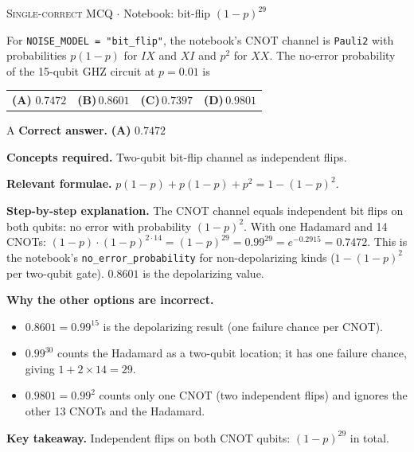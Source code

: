 \documentclass[11pt,a4paper]{article}
\newcommand{\optlabel}[1]{\textbf{(#1)}}
\newcommand{\correctlabel}[1]{\textcolor{okgreen}{\textbf{(#1)}\,\ding{51}}}
\newenvironment{qitem}[1]{\begin{list}{}{\setlength{\leftmargin}{3.3em}\setlength{\labelwidth}{3.1em}%
  \setlength{\labelsep}{0.2em}\setlength{\topsep}{3pt}\setlength{\parsep}{3pt}}\item[\textbf{Q.#1}\hfill]}{\end{list}}
\newcommand{\qsep}{\par\vspace{2pt}{\color{black!15}\hrule}\vspace{4pt}}
\newcommand{\qmeta}[2]{{\footnotesize\color{black!60}\textsc{#1} \;$\cdot$\; #2}\par}
\begin{document}
\begin{qitem}{47}
\qmeta{Single-correct MCQ}{Notebook: bit-flip $(1-p)^{29}$}
For \texttt{NOISE\_MODEL = "bit\_flip"}, the notebook's CNOT channel is \texttt{Pauli2} with probabilities $p(1-p)$ for $IX$ and $XI$ and $p^2$ for $XX$. The
no-error probability of the 15-qubit GHZ circuit at $p = 0.01$ is
\par\smallskip\noindent\begin{tabularx}{\linewidth}{@{}*{4}{L}@{}}
\correctlabel{A}\,$0.7472$ & \optlabel{B}\,$0.8601$ & \optlabel{C}\,$0.7397$ & \optlabel{D}\,$0.9801$
\end{tabularx}
\end{qitem}
\begin{solbox}{A}
\textbf{\color{brand}Correct answer.} \textcolor{okgreen}{\textbf{(A)}} $0.7472$

\textbf{\color{brand}Concepts required.} Two-qubit bit-flip channel as independent flips.

\textbf{\color{brand}Relevant formulae.} $p(1-p) + p(1-p) + p^2 = 1 - (1-p)^2$.

\textbf{\color{brand}Step-by-step explanation.} The CNOT channel equals independent bit flips on both qubits: no error with probability $(1-p)^2$. With one Hadamard and 14 CNOTs:
$(1-p)\cdot(1-p)^{2\cdot14} = (1-p)^{29} = 0.99^{29} = e^{-0.2915} = 0.7472$. This is the notebook's \texttt{no\_error\_probability} for non-depolarizing
kinds ($1 - (1-p)^2$ per two-qubit gate). $0.8601$ is the depolarizing value.

\textbf{\color{brand}Why the other options are incorrect.}
\begin{itemize}[leftmargin=2.4em, itemsep=1pt, topsep=2pt]
\item[\textbf{(B)}] $0.8601 = 0.99^{15}$ is the depolarizing result (one failure chance per CNOT).
\item[\textbf{(C)}] $0.99^{30}$ counts the Hadamard as a two-qubit location; it has one failure chance, giving $1 + 2\times14 = 29$.
\item[\textbf{(D)}] $0.9801 = 0.99^2$ counts only one CNOT (two independent flips) and ignores the other 13 CNOTs and the Hadamard.
\end{itemize}
\textbf{\color{brand}Key takeaway.} Independent flips on both CNOT qubits: $(1-p)^{29}$ in total.
\end{solbox}
\qsep
\end{document}
